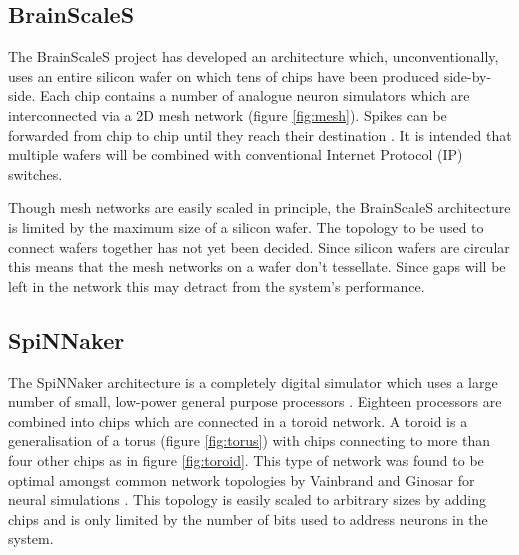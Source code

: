 	\subsection{BrainScaleS}
	
		The BrainScaleS project has developed an architecture which,
		unconventionally, uses an entire silicon wafer on which tens of chips have
		been produced side-by-side. Each chip contains a number of analogue neuron
		simulators which are interconnected via a 2D mesh network (figure
		\ref{fig:mesh}).  Spikes can be forwarded from chip to chip until they reach
		their destination \cite{schemmel08}. It is intended that multiple wafers
		will be combined with conventional Internet Protocol (IP) switches.
		
		Though mesh networks are easily scaled in principle, the BrainScaleS
		architecture is limited by the maximum size of a silicon wafer. The topology
		to be used to connect wafers together has not yet been decided.  Since
		silicon wafers are circular this means that the mesh networks on a wafer
		don't tessellate. Since gaps will be left in the network this may detract
		from the system's performance.
	
	\subsection{SpiNNaker}
	
		
		The SpiNNaker architecture is a completely digital simulator which uses a
		large number of small, low-power general purpose processors \cite{furber06}. Eighteen
		processors are combined into chips which are connected in a toroid network.
		A toroid is a generalisation of a torus (figure \ref{fig:torus}) with chips
		connecting to more than four other chips as in figure \ref{fig:toroid}. This
		type of network was found to be optimal amongst common network topologies by
		Vainbrand and Ginosar for neural simulations \cite{vainbrand11}. This
		topology is easily scaled to arbitrary sizes by adding chips and is only
		limited by the number of bits used to address neurons in the system.
		
